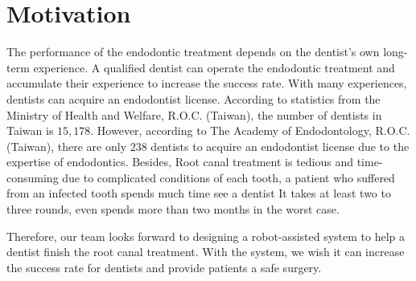 \section{Motivation}
The performance of the endodontic treatment depends on the dentist's own long-term experience. A qualified dentist can operate the endodontic treatment and accumulate their experience to increase the success rate. With many experiences, dentists can acquire an endodontist license. According to statistics from the Ministry of Health and Welfare, R.O.C. (Taiwan), the number of dentists in Taiwan is $15,178$. However, according to The Academy of Endodontology, R.O.C. (Taiwan), there are only $238$ dentists to acquire an endodontist license due to the expertise of endodontics. Besides, Root canal treatment is tedious and time-consuming due to complicated conditions of each tooth, a patient who suffered from an infected tooth spends much time see a dentist It takes at least two to three rounds, even spends more than two months in the worst case. 
\par
Therefore, our team looks forward to designing a robot-assisted system to help a dentist finish the root canal treatment. With the system, we wish it can increase the success rate for dentists and provide patients a safe surgery.

